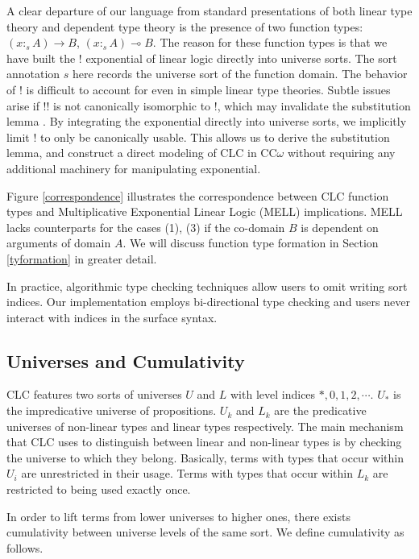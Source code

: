 \documentclass[sigplan,screen,review,authordraft]{acmart}
\theoremstyle{definition}
\begin{document}
  A clear departure of our language from standard presentations of both linear type theory and dependent type theory is the presence of two function types: $(x :_s A) \rightarrow B$, $(x :_s A) \multimap B$. The reason for these function types is that we have built the ! exponential of linear logic directly into universe sorts. The sort annotation $s$ here records the universe sort of the function domain. The behavior of ! is difficult to account for even in simple linear type theories. Subtle issues arise if !! is not canonically isomorphic to !, which may invalidate the substitution lemma \cite{substitute}. By integrating the exponential directly into universe sorts, we implicitly limit ! to only be canonically usable. This allows us to derive the substitution lemma, and construct a direct modeling of CLC in CC$\omega$ without requiring any additional machinery for manipulating exponential.

  Figure \ref{correspondence} illustrates the correspondence between CLC function types and Multiplicative Exponential Linear Logic (MELL) implications. MELL lacks counterparts for the cases (1), (3) if the co-domain $B$ is dependent on arguments of domain $A$. We will discuss function type formation in Section \ref{tyformation} in greater detail.

  In practice, algorithmic type checking techniques allow users to omit writing sort indices. Our implementation employs bi-directional type checking and users never interact with indices in the surface syntax.

  \subsection{Universes and Cumulativity}
  CLC features two sorts of universes $U$ and $L$ with level indices $*, 0, 1, 2, \cdots$. $U_*$ is the impredicative universe of propositions. $U_k$ and $L_k$ are the predicative universes of non-linear types and linear types respectively. The main mechanism that CLC uses to distinguish between linear and non-linear types is by checking the universe to which they belong. Basically, terms with types that occur within $U_i$ are unrestricted in their usage. Terms with types that occur within $L_k$ are restricted to being used exactly once.

  In order to lift terms from lower universes to higher ones, there exists cumulativity between universe levels of the same sort. We define cumulativity as follows.
\end{document}
